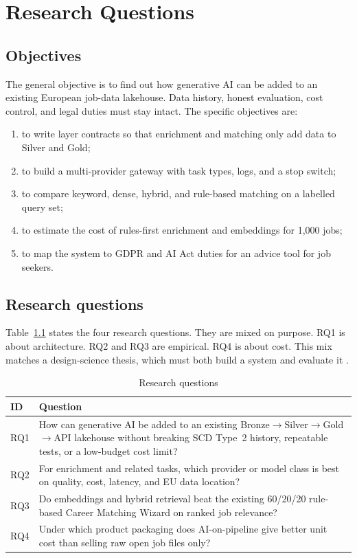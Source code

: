 \chapter{Research Questions}
\label{ch:rqs}

\section{Objectives}
\label{sec:objectives}

The general objective is to find out how generative AI can be added to an existing European job-data lakehouse. Data history, honest evaluation, cost control, and legal duties must stay intact. The specific objectives are:

\begin{enumerate}
  \item to write layer contracts so that enrichment and matching only add data to Silver and Gold;
  \item to build a multi-provider gateway with task types, logs, and a stop switch;
  \item to compare keyword, dense, hybrid, and rule-based matching on a labelled query set;
  \item to estimate the cost of rules-first enrichment and embeddings for 1{,}000 jobs;
  \item to map the system to GDPR and AI Act duties for an advice tool for job seekers.
\end{enumerate}

\section{Research questions}
\label{sec:questions}

Table~\ref{tab:rqs} states the four research questions. They are mixed on purpose. RQ1 is about architecture. RQ2 and RQ3 are empirical. RQ4 is about cost. This mix matches a design-science thesis, which must both build a system and evaluate it .

\begin{table}[ht]
\centering
\caption{Research questions}
\label{tab:rqs}
\begin{tabularx}{\textwidth}{@{}lX@{}}
\toprule
\textbf{ID} & \textbf{Question} \\
\midrule
RQ1 & How can generative AI be added to an existing Bronze$\rightarrow$Silver$\rightarrow$Gold$\rightarrow$API lakehouse without breaking SCD Type~2 history, repeatable tests, or a low-budget cost limit? \\
RQ2 & For enrichment and related tasks, which provider or model class is best on quality, cost, latency, and EU data location? \\
RQ3 & Do embeddings and hybrid retrieval beat the existing 60/20/20 rule-based Career Matching Wizard on ranked job relevance? \\
RQ4 & Under which product packaging does AI-on-pipeline give better unit cost than selling raw open job files only? \\
\bottomrule
\end{tabularx}
\end{table}


